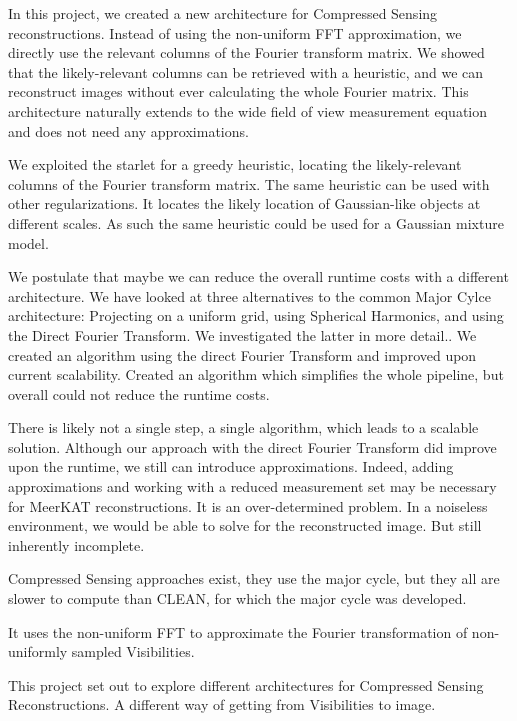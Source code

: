 In this project, we created a new architecture for Compressed Sensing reconstructions. Instead of using the non-uniform FFT approximation, we directly use the relevant columns of the Fourier transform matrix. We showed that the likely-relevant columns can be retrieved with a heuristic, and we can reconstruct images without ever calculating the whole Fourier matrix. This architecture naturally extends to the wide field of view measurement equation and does not need any approximations. 

We exploited the starlet for a greedy heuristic, locating the likely-relevant columns of the Fourier transform matrix. The same heuristic can be used with other regularizations. It locates the likely location of Gaussian-like objects at different scales. As such the same heuristic could be used for a Gaussian mixture model. 



We postulate that maybe we can reduce the overall runtime costs with a different architecture. We have looked at three alternatives to the common Major Cylce architecture: Projecting on a uniform grid, using Spherical Harmonics, and using the Direct Fourier Transform. We investigated the latter in more detail.. We created an algorithm using the direct Fourier Transform and improved upon current scalability. Created an algorithm which simplifies the whole pipeline, but overall could not reduce the runtime costs.





There is likely not a single step, a single algorithm, which leads to a scalable solution. Although our approach with the direct Fourier Transform did improve upon the runtime, we still can introduce approximations. Indeed, adding approximations and working with a reduced measurement set may be necessary for MeerKAT reconstructions. It is an over-determined problem. In a noiseless environment, we would be able to solve for the reconstructed image. But still inherently incomplete.



 Compressed Sensing approaches exist, they use the major cycle, but they all are slower to compute than CLEAN, for which the major cycle was developed. 

It uses the non-uniform FFT to approximate the Fourier transformation of non-uniformly sampled Visibilities.

This project set out to explore different architectures for Compressed Sensing Reconstructions. A different way of getting from Visibilities to image. 

